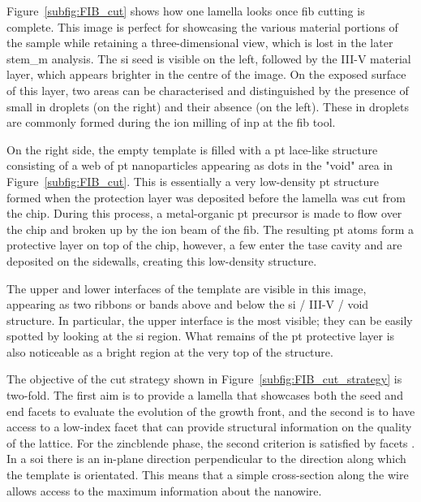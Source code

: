 Figure~\ref{subfig:FIB_cut} shows how one lamella looks once \acs{fib} cutting is complete. This image is perfect for showcasing the various material portions of the sample while retaining a three-dimensional view, which is lost in the later \acs{stem_m} analysis. The \acl{si} seed is visible on the left, followed by the III-V material layer, which appears brighter in the centre of the image. On the exposed surface of this layer, two areas can be characterised and distinguished by the presence of small \acl{in} droplets (on the right) and their absence (on the left). These \acl{in} droplets are commonly formed during the ion milling of \acl{inp} at the \acs{fib} tool. 

On the right side, the empty template is filled with a \acl{pt} lace-like structure consisting of a web of \acl{pt} nanoparticles appearing as dots in the "void" area in Figure~\ref{subfig:FIB_cut}. This is essentially a very low-density \acl{pt} structure formed when the protection layer was deposited before the lamella was cut from the chip. During this process, a metal-organic \acl{pt} precursor is made to flow over the chip and broken up by the ion beam of the \acs{fib}. The resulting \acl{pt} atoms form a protective layer on top of the chip, however, a few enter the \acs{tase} cavity and are deposited on the sidewalls, creating this low-density structure.

The upper and lower interfaces of the template are visible in this image, appearing as two ribbons or bands above and below the \acl{si} / III-V / void structure. In particular, the upper interface is the most visible; they can be easily spotted by looking at the \acl{si} region. What remains of the \acl{pt} protective layer is also noticeable as a bright region at the very top of the structure.

The objective of the cut strategy shown in Figure~\ref{subfig:FIB_cut_strategy} is two-fold. The first aim is to provide a lamella that showcases both the seed and end facets to evaluate the evolution of the growth front, and the second is to have access to a low-index facet that can provide structural information on the quality of the lattice. For the zincblende phase, the second criterion is satisfied by  facets \cite{Dasilva2017}. In a  \acs{soi} there is an in-plane \hkl[-1 1 0] direction perpendicular to the \hkl[1 1 0] direction along which the template is orientated. This means that a simple cross-section along the wire allows access to the maximum information about the nanowire.


